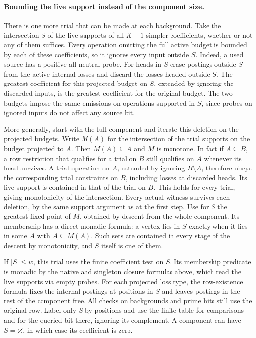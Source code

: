 \paragraph{Bounding the live support instead of the component size.}
There is one more trial that can be made at each background.
Take the intersection $S$ of the live supports of all $K+1$
simpler coefficients, whether or not any of them suffices.
Every operation omitting the full active budget is bounded by
each of these coefficients, so it ignores every input outside
$S$. Indeed, a used source has a positive all-neutral probe.
For heads in $S$ erase postings outside $S$ from the active
internal losses and discard the losses headed outside $S$.
The greatest coefficient for this projected budget on $S$,
extended by ignoring the discarded inputs, is the greatest
coefficient for the original budget. The two budgets impose
the same omissions on operations supported in $S$, since
probes on ignored inputs do not affect any source bit.

More generally, start with the full component and iterate
this deletion on the projected budgets. Write $M(A)$ for
the intersection of the trial supports on the budget projected
to $A$. Then $M(A)\subseteq A$ and $M$ is monotone. In fact
if $A\subseteq B$, a row restriction that qualifies for a
trial on $B$ still qualifies on $A$ whenever its head survives.
A trial operation on $A$, extended by ignoring $B\setminus A$,
therefore obeys the corresponding trial constraints on $B$,
including losses at discarded heads. Its live support is
contained in that of the trial on $B$. This holds for every
trial, giving monotonicity of the intersection. Every actual
witness survives each deletion, by the same support argument
as at the first step. Use for $S$ the greatest fixed point
of $M$, obtained by descent from the whole component. Its
membership has a direct monadic formula: a vertex lies in
$S$ exactly when it lies in some $A$ with $A\subseteq M(A)$.
Such sets are contained in every stage of the descent by
monotonicity, and $S$ itself is one of them.

If $|S|\le w$, this trial uses the finite coefficient test
on $S$. Its membership predicate is monadic by the native
and singleton closure formulas above, which read the live
supports via empty probes. For each projected loss type,
the row-existence formula fixes the internal postings at
positions in $S$ and leaves postings in the rest of the
component free. All checks on backgrounds and prime hits
still use the original row. Label only $S$ by positions
and use the finite table for comparisons and for the queried
bit there, ignoring its complement. A component can have
$S=\varnothing$, in which case its coefficient is zero.

